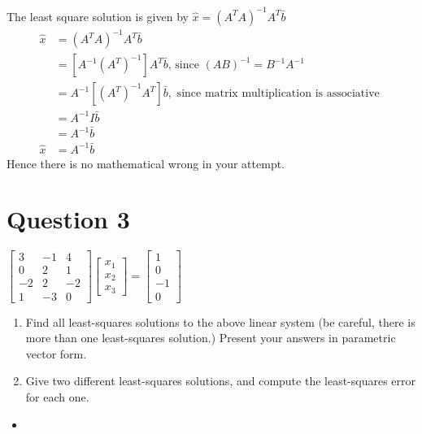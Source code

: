 \documentclass{article}
\begin{document}
The least square solution is given by $\hat{x}=\left(A^{T} A\right)^{-1} A^{T} \bar{b}$
$$
\begin{aligned}
\hat{x} &=\left(A^{T} A\right)^{-1} A^{T} \bar{b} \\
&=\left[A^{-1}\left(A^{T}\right)^{-1}\right] A^{T} \bar{b} \text {, since }(A B)^{-1}=B^{-1} A^{-1} \\
&=A^{-1}\left[\left(A^{T}\right)^{-1} A^{T}\right] \bar{b}, \text { since matrix multiplication is associative } \\
&=A^{-1} I \bar{b} \\
&=A^{-1} \bar{b} \\
\hat{x} &=A^{-1} \bar{b}
\end{aligned}
$$
Hence there is no mathematical wrong in your attempt.

\section{Question 3}
	\item $\begin{bmatrix}
	3 & -1 & 4\\
	0 & 2 & 1\\
	-2 & 2 & -2\\
	1 & -3 & 0
	\end{bmatrix}\begin{bmatrix}
	x_1\\ x_2\\ x_3
	\end{bmatrix} = \begin{bmatrix}
	1\\ 0\\ -1\\ 0
	\end{bmatrix}$ \begin{enumerate}
		\item Find all least-squares solutions to the above linear system (be careful, there is more than one least-squares solution.)  Present your answers in parametric vector form.
		\item Give two different least-squares solutions, and compute the least-squares error for each one.
	\end{enumerate}
	
\begin{itemize}
    \item 
\end{itemize}
\end{document}
